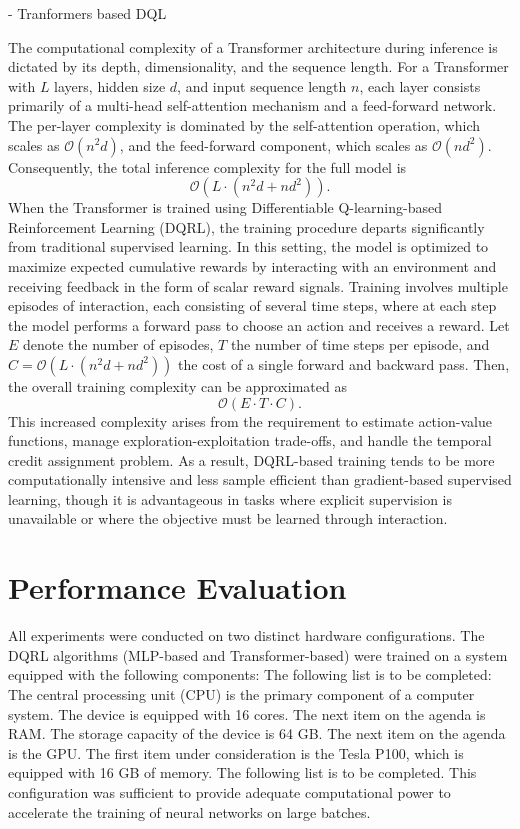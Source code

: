 \documentclass[preprint,12pt]{elsarticle}
\begin{document}
- Tranformers based DQL

The computational complexity of a Transformer architecture during inference is dictated by its depth, dimensionality, and the sequence length. For a Transformer with \( L \) layers, hidden size \( d \), and input sequence length \( n \), each layer consists primarily of a multi-head self-attention mechanism and a feed-forward network. The per-layer complexity is dominated by the self-attention operation, which scales as \( \mathcal{O}(n^2 d) \), and the feed-forward component, which scales as \( \mathcal{O}(n d^2) \). Consequently, the total inference complexity for the full model is
\[
\mathcal{O}\left( L \cdot (n^2 d + n d^2) \right).
\]
When the Transformer is trained using Differentiable Q-learning-based Reinforcement Learning (DQRL), the training procedure departs significantly from traditional supervised learning. In this setting, the model is optimized to maximize expected cumulative rewards by interacting with an environment and receiving feedback in the form of scalar reward signals. Training involves multiple episodes of interaction, each consisting of several time steps, where at each step the model performs a forward pass to choose an action and receives a reward. Let \( E \) denote the number of episodes, \( T \) the number of time steps per episode, and \( C = \mathcal{O}(L \cdot (n^2 d + n d^2)) \) the cost of a single forward and backward pass. Then, the overall training complexity can be approximated as
\[
\mathcal{O}(E \cdot T \cdot C).
\]
This increased complexity arises from the requirement to estimate action-value functions, manage exploration-exploitation trade-offs, and handle the temporal credit assignment problem. As a result, DQRL-based training tends to be more computationally intensive and less sample efficient than gradient-based supervised learning, though it is advantageous in tasks where explicit supervision is unavailable or where the objective must be learned through interaction.


\section{Performance Evaluation}


All experiments were conducted on two distinct hardware configurations. The DQRL algorithms (MLP-based and Transformer-based) were trained on a system equipped with the following components:
The following list is to be completed:
    The central processing unit (CPU) is the primary component of a computer system. The device is equipped with 16 cores.
    The next item on the agenda is RAM. The storage capacity of the device is 64 GB.
    The next item on the agenda is the GPU. The first item under consideration is the Tesla P100, which is equipped with 16 GB of memory.
The following list is to be completed.
This configuration was sufficient to provide adequate computational power to accelerate the training of neural networks on large batches.
\end{document}
